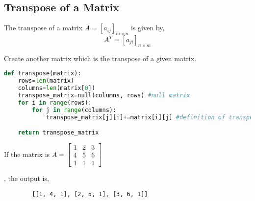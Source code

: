 	\subsection{Transpose of a Matrix}
	The transpose of a matrix $A=[a_{ij}]_{m\times n}$ is given by,
	\[A^T=[a_{ji}]_{n\times m}\]
	\begin{eg}
		Create another matrix which is the transpose of a given matrix.
	\end{eg}
	\begin{explanation}
		\begin{lstlisting}[language=Python]
def transpose(matrix):
	rows=len(matrix)
	columns=len(matrix[0])
	transpose_matrix=null(columns, rows) #null matrix
	for i in range(rows):
		for j in range(columns):
			transpose_matrix[j][i]+=matrix[i][j] #definition of transpose

	return transpose_matrix \end{lstlisting}
	If the matrix is $A=\begin{bmatrix}
		1&2&3\\
		4&5&6\\
		1&1&1
	\end{bmatrix}$
	\end{explanation}, the output is,
	\begin{verbatim}
		[[1, 4, 1], [2, 5, 1], [3, 6, 1]]
	\end{verbatim}
